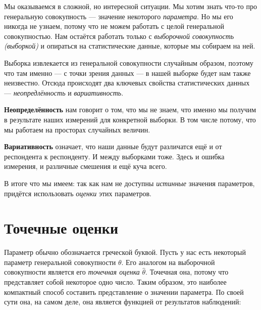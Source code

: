 \documentclass[
  letterpaper,
  DIV=11,
  numbers=noendperiod]{scrreprt}
\newcommand{\norm}{\mathcal{N}}
\newcommand{\def}{\overset{\text{def}}{=}}
\newcommand{\sgn}{\mathrm{sgn}}
\newcommand{\artanh}{\text{artanh}}
\newcommand{\median}{\mathrm{median}}
\newcommand{\mean}{\mathbb{M}}
\newcommand{\skew}{\mathrm{skew}}
\newcommand{\kurt}{\mathrm{kurt}}
\theoremstyle{definition}
\theoremstyle{remark}
\begin{document}
\newcommand{\norm}{\mathcal{N}}

\newcommand{\def}{\overset{\text{def}}{=}}
\newcommand{\sgn}{\text{sgn}}

\usepackage{amsmath}
\DeclareMathOperator\artanh{artanh}

\newcommand{\median}{\text{median}}
\newcommand{\mean}{\mathbb{M}}
\newcommand{\skew}{\mathrm{skew}}
\newcommand{\kurt}{\mathrm{kurt}}

Мы оказываемся в сложной, но интересной ситуации. Мы хотим знать что-то
про генеральную совокупность --- значение некоторого \emph{параметра}.
Но мы его никогда не узнаем, потому что не можем работать с целой
генеральной совокупностью. Нам остаётся работать только с
\emph{выборочной совокупность (выборкой)} и опираться на статистические
данные, которые мы собираем на ней.

Выборка извлекается из генеральной совокупности случайным образом,
поэтому что там именно --- с точки зрения данных --- в нашей выборке
будет нам также неизвестно. Отсюда происходят два ключевых свойства
статистических данных --- \emph{неопредлённость} и \emph{вариативность}.

\textbf{Неопределённость} нам говорит о том, что мы не знаем, что именно
мы получим в результате наших измерений для конкретной выборки. В том
числе потому, что мы работаем на просторах случайных величин.

\textbf{Вариативность} означает, что наши данные будут различатся ещё и
от респондента к респонденту. И между выборками тоже. Здесь и ошибка
измерения, и различные смешения и ещё куча всего.

В итоге что мы имеем: так как нам не доступны \emph{истинные} значения
параметров, придётся использовать \emph{оценки} этих параметров.

\section{Точечные
оценки}\label{ux442ux43eux447ux435ux447ux43dux44bux435-ux43eux446ux435ux43dux43aux438}

Параметр обычно обозначается греческой буквой. Пусть у нас есть
некоторый параметр генеральной совокупности \(\theta\). Его аналогом на
выборочной совокупности является его \emph{точечная оценка}
\(\hat \theta\). Точечная она, потому что представляет собой некоторое
одно число. Таким образом, это наиболее компактный способ составить
представление о значении параметра. По своей сути она, на самом деле,
она является функцией от результатов наблюдений:
\end{document}
